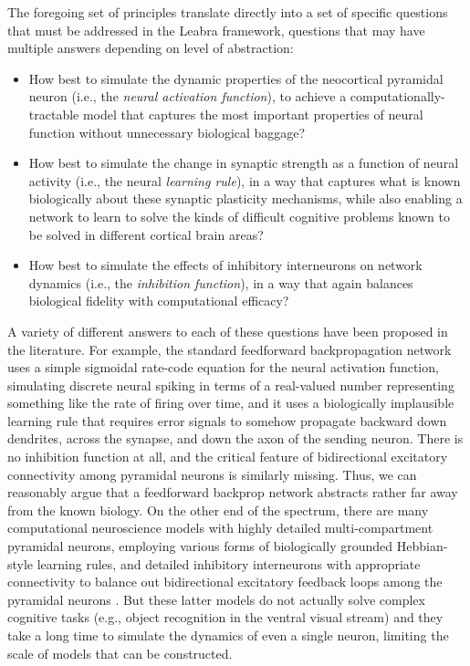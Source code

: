 \documentclass[11pt,twoside]{article}
\begin{document}
The foregoing set of principles translate directly into a set of specific
questions that must be addressed in the Leabra framework, questions that may
have multiple answers depending on level of abstraction:
\begin{itemize}
\item How best to simulate the dynamic properties of the neocortical pyramidal
  neuron (i.e., the {\em neural activation function}), to achieve a
  computationally-tractable model that captures the most important properties
  of neural function without unnecessary biological baggage?
\item How best to simulate the change in synaptic strength as a function of
  neural activity (i.e., the neural {\em learning rule}), in a way that
  captures what is known biologically about these synaptic plasticity
  mechanisms, while also enabling a network to learn to solve the kinds of
  difficult cognitive problems known to be solved in different cortical brain
  areas?
\item How best to simulate the effects of inhibitory interneurons on network
  dynamics (i.e., the {\em inhibition function}), in a way that again balances
  biological fidelity with computational efficacy?
\end{itemize}

A variety of different answers to each of these questions have been proposed
in the literature.  For example, the standard feedforward backpropagation
network uses a simple sigmoidal rate-code equation for the neural activation
function, simulating discrete neural spiking in terms of a real-valued number
representing something like the rate of firing over time, and it uses a
biologically implausible learning rule that requires error signals to somehow
propagate backward down dendrites, across the synapse, and down the axon of
the sending neuron.  There is no inhibition function at all, and the critical
feature of bidirectional excitatory connectivity among pyramidal neurons is
similarly missing.  Thus, we can reasonably argue that a feedforward backprop
network abstracts rather far away from the known biology.  On the other end of
the spectrum, there are many computational neuroscience models with highly
detailed multi-compartment pyramidal neurons, employing various forms of
biologically grounded Hebbian-style learning rules, and detailed inhibitory
interneurons with appropriate connectivity to balance out bidirectional
excitatory feedback loops among the pyramidal neurons
\cite{BretteGerstner05,UrakuboHondaFroemkeEtAl08,MOREbiodetrefs}.  But these
latter models do not actually solve complex cognitive tasks (e.g., object
recognition in the ventral visual stream) and they take a long time to
simulate the dynamics of even a single neuron, limiting the scale of models
that can be constructed.
\end{document}
